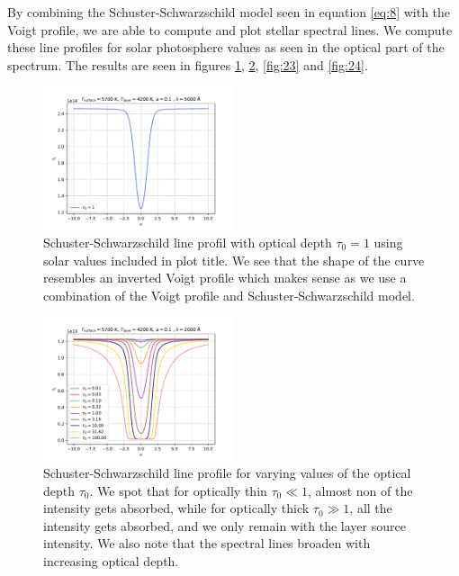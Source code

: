 \documentclass[a4paper,11.5pt,]{article}
\begin{document}
\begin{multicols}{2}
By combining the Schuster-Schwarzschild model seen in equation \eqref{eq:8} with the Voigt profile, we are able to compute and plot stellar spectral lines. We compute these line profiles for solar photosphere values as seen in the optical part of the spectrum. The results are seen in figures \ref{fig:21}, \ref{fig:22}, \ref{fig:23} and \ref{fig:24}.
\begin{figure}[H]
	\centering
	\includegraphics[width=0.5\textwidth]{SSA/figures/ssline.pdf}
	\caption{Schuster-Schwarzschild line profil with optical depth $\tau_0 = 1$ using solar values included in plot title. We see that the shape of the curve resembles an inverted Voigt profile which makes sense as we use a combination of the Voigt profile and Schuster-Schwarzschild model.}
	\label{fig:21}
\end{figure}


\begin{figure}[H]
	\centering
	\includegraphics[width=0.5\textwidth]{SSA/figures/ss0.pdf}
	\caption{Schuster-Schwarzschild line profile for varying values of the optical depth $\tau_0$. We spot that for optically thin $\tau_0 \ll 1$, almost non of the intensity gets absorbed, while for optically thick $\tau_0 \gg 1$, all the intensity gets absorbed, and we only remain with the layer source intensity. We also note that the spectral lines broaden with increasing optical depth. }
	\label{fig:22}
\end{figure}



\end{multicols}
\end{document}
